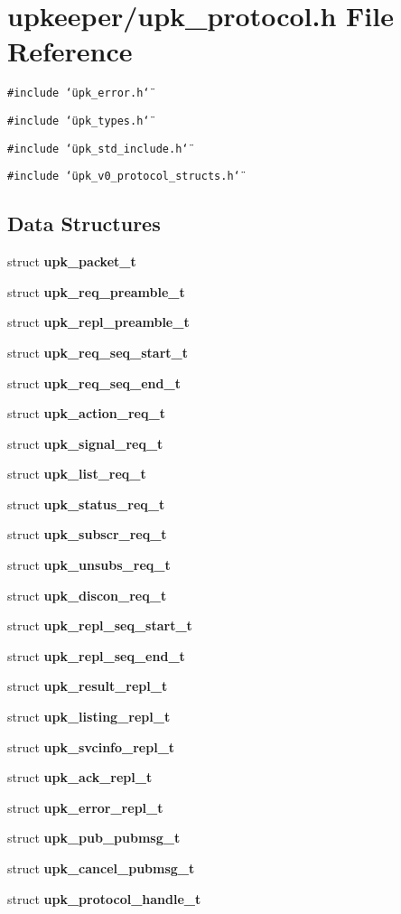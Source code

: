 \section{upkeeper/upk\_\-protocol.h File Reference}
\label{upk__protocol_8h}
{\tt \#include \char`\"{}upk\_\-error.h\char`\"{}}\par
{\tt \#include \char`\"{}upk\_\-types.h\char`\"{}}\par
{\tt \#include \char`\"{}upk\_\-std\_\-include.h\char`\"{}}\par
{\tt \#include \char`\"{}upk\_\-v0\_\-protocol\_\-structs.h\char`\"{}}\par
\subsection*{Data Structures}
\begin{CompactItemize}
\item 
struct \bf{upk\_\-packet\_\-t}
\item 
struct \bf{upk\_\-req\_\-preamble\_\-t}
\item 
struct \bf{upk\_\-repl\_\-preamble\_\-t}
\item 
struct \bf{upk\_\-req\_\-seq\_\-start\_\-t}
\item 
struct \bf{upk\_\-req\_\-seq\_\-end\_\-t}
\item 
struct \bf{upk\_\-action\_\-req\_\-t}
\item 
struct \bf{upk\_\-signal\_\-req\_\-t}
\item 
struct \bf{upk\_\-list\_\-req\_\-t}
\item 
struct \bf{upk\_\-status\_\-req\_\-t}
\item 
struct \bf{upk\_\-subscr\_\-req\_\-t}
\item 
struct \bf{upk\_\-unsubs\_\-req\_\-t}
\item 
struct \bf{upk\_\-discon\_\-req\_\-t}
\item 
struct \bf{upk\_\-repl\_\-seq\_\-start\_\-t}
\item 
struct \bf{upk\_\-repl\_\-seq\_\-end\_\-t}
\item 
struct \bf{upk\_\-result\_\-repl\_\-t}
\item 
struct \bf{upk\_\-listing\_\-repl\_\-t}
\item 
struct \bf{upk\_\-svcinfo\_\-repl\_\-t}
\item 
struct \bf{upk\_\-ack\_\-repl\_\-t}
\item 
struct \bf{upk\_\-error\_\-repl\_\-t}
\item 
struct \bf{upk\_\-pub\_\-pubmsg\_\-t}
\item 
struct \bf{upk\_\-cancel\_\-pubmsg\_\-t}
\item 
struct \bf{upk\_\-protocol\_\-handle\_\-t}
\end{CompactItemize}
